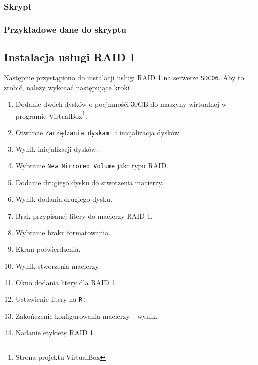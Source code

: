 \subsubsection{Skrypt}
\clearpage
\subsubsection{Przykładowe dane do skryptu}
\clearpage

\subsection{Instalacja usługi RAID 1}
Następnie przystąpiono do instalacji usługi RAID 1 na serwerze \texttt{SDC06}. Aby to zrobić, należy wykonać następujące kroki:
\begin{enumerate}
	\item Dodanie dwóch dysków o poejmnośći 30GB do maszyny wirtualnej w programie VirtualBox\footnote{Strona projektu VirtualBox\cite{VirtualBox}}.  %
	\item Otwarcie \texttt{Zarządzania dyskami} i inicjalizacja dysków  %
	\item Wynik inicjalizacji dysków.  %
	\item Wybranie \texttt{New Mirrored Volume} jako typu RAID.  %
	\item Dodanie drugiego dysku do stworzenia macierzy.  %
	\item Wynik dodania drugiego dysku.  %
	\item Brak przypisanej litery do macierzy RAID 1.  %
	\item Wybranie braku formatowania.  %
	\item Ekran potwierdzenia.  %
	\item Wynik stworzenia macierzy.  %
	\item Okno dodania litery dla RAID 1.  %
	\item Ustawienie litery na \texttt{R:}.  %
	\item Zakończenie konfigurowania macierzy – wynik.  %
	\item Nadanie etykiety RAID 1.  %
\end{enumerate}


